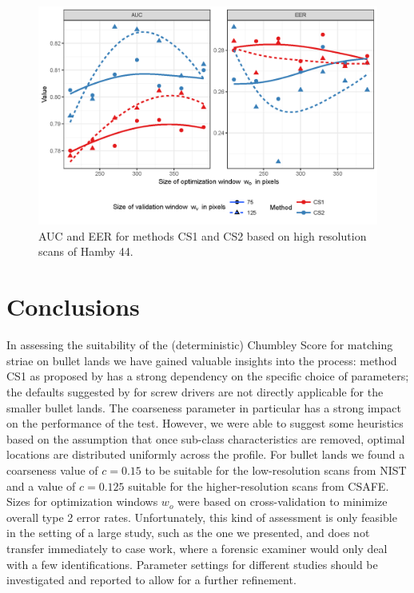 \documentclass[12pt]{article}
\begin{document}
\begin{figure}

{\centering \includegraphics[width=\textwidth]{figures/h44-1} 

}

\caption{AUC and EER for methods CS1 and CS2 based on high resolution scans of Hamby 44. }\label{fig:h44}
\end{figure}

\section{Conclusions}\label{conclusions}

In assessing the suitability of the (deterministic) Chumbley Score for
matching striae on bullet lands we have gained valuable insights into
the process: method CS1 as proposed by \citet{hadler} has a strong
dependency on the specific choice of parameters; the defaults suggested
by \citet{hadler} for screw drivers are not directly applicable for the
smaller bullet lands. The coarseness parameter in particular has a
strong impact on the performance of the test. However, we were able to
suggest some heuristics based on the assumption that once sub-class
characteristics are removed, optimal locations are distributed uniformly
across the profile. For bullet lands we found a coarseness value of
\(c = 0.15\) to be suitable for the low-resolution scans from NIST and a
value of \(c=0.125\) suitable for the higher-resolution scans from
CSAFE. Sizes for optimization windows \(w_o\) were based on
cross-validation to minimize overall type 2 error rates. Unfortunately,
this kind of assessment is only feasible in the setting of a large
study, such as the one we presented, and does not transfer immediately
to case work, where a forensic examiner would only deal with a few
identifications. Parameter settings for different studies should be
investigated and reported to allow for a further refinement.
\end{document}
